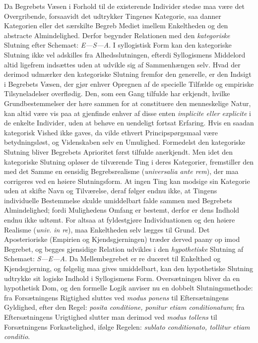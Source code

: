 \documentclass[12pt]{book}
\newcommand{\opage}[1]{\marginnote{\footnotesize\textit{[#1]}}}
\begin{document}
Da Begrebets Væsen i Forhold til de existerende Individer stedse maa være det
Overgribende, forsaavidt det udtrykker Tingenes Kategorie, saa danner Kategorien
eller det særskilte Begreb Mediet imellem Enkeltheden og den abstracte
\opage{84} %
Almindelighed. Derfor begynder Relationen med den \emph{kategoriske} Slutning efter
Schemaet: \textit{E---S---A}. I syllogistisk Form kan den kategoriske Slutning ikke
vel adskilles fra Alhedsslutningen, efterdi Syllogismens Middelord altid ligefrem
indsættes uden at udvikle sig af Sammenhængen selv. Hvad der derimod udmærker den
kategoriske Slutning fremfor den generelle, er den Indsigt i Begrebets Væsen, der
gjør enhver Opregnen af de specielle Tilfælde og empiriske Tilsyneladelser
overflødig. Den, som een Gang tilfulde har erkjendt, hvilke Grundbestemmelser der
høre sammen for at constituere den menneskelige Natur, kan altid være vis paa at
gjenfinde enhver af disse enten \textit{implicite eller explicite} i de enkelte
Individer, uden at behøve en uendeligt fortsat Erfaring. Hvis en saadan kategorisk
Vished ikke gaves, da vilde ethvert Principspørgsmaal være betydningsløst, og
Videnskaben selv en Umulighed. Formedelst den kategoriske Slutning bliver Begrebets
Aprioritet først tilfulde anerkjendt. Men idet den kategoriske Slutning opløser de
tilværende Ting i deres Kategorier, fremstiller den med det Samme en eensidig
Begrebsrealisme (\textit{universalia ante rem}), der maa corrigeres ved en høiere
Slutningsform. At ingen Ting kan modsige sin Kategorie uden at skifte Navn og
Tilværelse, deraf følger endnu ikke, at Tingens individuelle Bestemmelse skulde
umiddelbart falde sammen med Begrebets Almindelighed; fordi Mulighedens Omfang er
bestemt, derfor er dens Indhold endnu ikke udtømt. For altsaa at fyldestgjøre
Individuationen og den høiere Realisme (\textit{univ. in re}), maa Enkeltheden selv
lægges til Grund. Det Aposterioriske (Empirien og Kjendsgjerningen) træder derved
paany op imod Begrebet, og begges gjensidige Relation udvikles i den
\emph{hypothetiske} Slutning af Schemaet: \textit{S---E---A}. Da Mellembegrebet er
re%
\opage{85}duceret til Enkelthed og Kjendsgjerning, og følgelig maa gives umiddelbart, kan den
hypothetiske Slutning udtrykke sit logiske Indhold i Syllogismens Form.
Oversætningen bliver da en hypothetisk Dom, og den formelle Logik anviser nu en
dobbelt Slutningsmethode: fra Forsætningens Rigtighed sluttes ved \textit{modus
ponens} til Eftersætningens Gyldighed, efter den Regel: \textit{posita conditione,
ponitur etiam conditionatum}; fra Eftersætningens Urigtighed slutter man derimod ved
\textit{modus tollens} til Forsætningens Forkastelighed, ifølge Regelen:
\textit{sublato conditionato, tollitur etiam conditio}.
\end{document}
